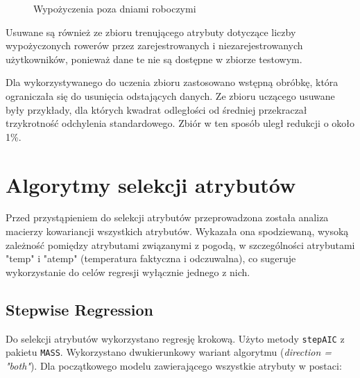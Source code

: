 \documentclass[a4paper,12pt]{article}
\begin{document}
\begin{figure}[!htb]
    \center
    \caption{Wypożyczenia poza dniami roboczymi}
\end{figure}
    
Usuwane są również ze zbioru trenującego atrybuty dotyczące liczby wypożyczonych rowerów przez zarejestrowanych i niezarejestrowanych użytkowników, ponieważ dane te nie są dostępne w zbiorze testowym.

Dla wykorzystywanego do uczenia zbioru zastosowano wstępną obróbkę, która ograniczała się do usunięcia odstających danych. Ze zbioru uczącego usuwane były przykłady, dla których kwadrat odległości od średniej przekraczał trzykrotność odchylenia standardowego. Zbiór w ten sposób uległ redukcji o około 1\%.

\section{Algorytmy selekcji atrybutów}

    Przed przystąpieniem do selekcji atrybutów przeprowadzona została analiza macierzy kowariancji wszystkich atrybutów. Wykazała ona
    spodziewaną, wysoką zależność pomiędzy atrybutami związanymi z pogodą, w szczególności atrybutami "temp" i "atemp" (temperatura faktyczna i odczuwalna),
    co sugeruje wykorzystanie do celów regresji wyłącznie jednego z nich.
    
    \subsection{Stepwise Regression}
    
        Do selekcji atrybutów wykorzystano regresję krokową. Użyto metody \texttt{stepAIC} z pakietu \texttt{MASS}. Wykorzystano dwukierunkowy wariant algorytmu (\textit{direction = "both"}).
        Dla początkowego modelu zawierającego wszystkie atrybuty w postaci:
        
\end{document}
